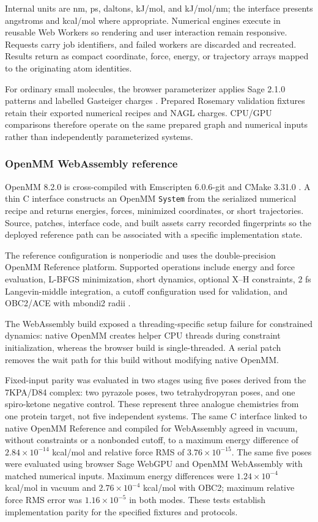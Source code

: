 \documentclass[11pt]{article}
\begin{document}
\begin{small}
Internal units are nm, ps, daltons, kJ/mol, and kJ/mol/nm; the interface presents angstroms and kcal/mol where appropriate. Numerical engines execute in reusable Web Workers so rendering and user interaction remain responsive. Requests carry job identifiers, and failed workers are discarded and recreated. Results return as compact coordinate, force, energy, or trajectory arrays mapped to the originating atom identities.

For ordinary small molecules, the browser parameterizer applies Sage 2.1.0 patterns and labelled Gasteiger charges \citep{boothroyd2023sage,gasteiger1980charges}. Prepared Rosemary validation fixtures retain their exported numerical recipes and NAGL charges. CPU/GPU comparisons therefore operate on the same prepared graph and numerical inputs rather than independently parameterized systems.

\subsubsection{OpenMM WebAssembly reference}

OpenMM 8.2.0 is cross-compiled with Emscripten 6.0.6-git and CMake 3.31.0 \citep{eastman2017openmm7,eastman2024openmm8}. A thin C interface constructs an OpenMM \texttt{System} from the serialized numerical recipe and returns energies, forces, minimized coordinates, or short trajectories. Source, patches, interface code, and built assets carry recorded fingerprints so the deployed reference path can be associated with a specific implementation state.

The reference configuration is nonperiodic and uses the double-precision OpenMM Reference platform. Supported operations include energy and force evaluation, L-BFGS minimization, short dynamics, optional X--H constraints, 2 fs Langevin-middle integration, a cutoff configuration used for validation, and OBC2/ACE with mbondi2 radii \citep{onufriev2004gb}.

The WebAssembly build exposed a threading-specific setup failure for constrained dynamics: native OpenMM creates helper CPU threads during constraint initialization, whereas the browser build is single-threaded. A serial patch removes the wait path for this build without modifying native OpenMM.

Fixed-input parity was evaluated in two stages using five poses derived from the 7KPA/D84 complex: two pyrazole poses, two tetrahydropyran poses, and one spiro-ketone negative control. These represent three analogue chemistries from one protein target, not five independent systems. The same C interface linked to native OpenMM Reference and compiled for WebAssembly agreed in vacuum, without constraints or a nonbonded cutoff, to a maximum energy difference of $2.84 \times 10^{-14}$ kcal/mol and relative force RMS of $3.76 \times 10^{-15}$. The same five poses were evaluated using browser Sage WebGPU and OpenMM WebAssembly with matched numerical inputs. Maximum energy differences were $1.24 \times 10^{-4}$ kcal/mol in vacuum and $2.76 \times 10^{-4}$ kcal/mol with OBC2; maximum relative force RMS error was $1.16 \times 10^{-5}$ in both modes. These tests establish implementation parity for the specified fixtures and protocols.


\end{small}
\end{document}
